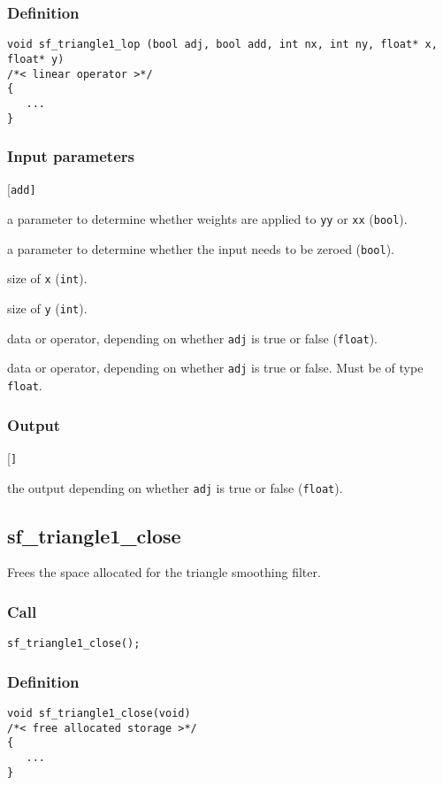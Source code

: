 \subsubsection*{Definition}
\begin{verbatim}
void sf_triangle1_lop (bool adj, bool add, int nx, int ny, float* x, float* y)
/*< linear operator >*/
{
   ...  
}
\end{verbatim}

\subsubsection*{Input parameters}
\begin{desclist}{\tt }{\quad}[\tt add]
   \setlength\itemsep{0pt}
   \item[adj] a parameter to determine whether weights are applied to \texttt{yy} or \texttt{xx} (\texttt{bool}). 
   \item[add] a parameter to determine whether the input needs to be zeroed (\texttt{bool}).
   \item[nx]  size of \texttt{x} (\texttt{int}). 
   \item[ny]  size of \texttt{y} (\texttt{int}).
   \item[x]   data or operator, depending on whether \texttt{adj} is true or false (\texttt{float}). 
   \item[y]   data or operator, depending on whether \texttt{adj} is true or false.  Must be of type \texttt{float}.
\end{desclist}

\subsubsection*{Output}
\begin{desclist}{\tt }{\quad}[\tt ]
   \setlength\itemsep{0pt}
   \item[\texttt{x} or \texttt{y}] the output depending on whether \texttt{adj} is true or false (\texttt{float}).
\end{desclist}




\subsection{{sf\_triangle1\_close}}
Frees the space allocated for the triangle smoothing filter.

\subsubsection*{Call}
\begin{verbatim}sf_triangle1_close();\end{verbatim}

\subsubsection*{Definition}
\begin{verbatim}
void sf_triangle1_close(void)
/*< free allocated storage >*/
{
   ...
}
\end{verbatim}





